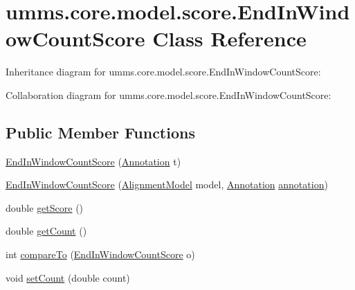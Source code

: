 \hypertarget{classumms_1_1core_1_1model_1_1score_1_1_end_in_window_count_score}{\section{umms.\+core.\+model.\+score.\+End\+In\+Window\+Count\+Score Class Reference}
\label{classumms_1_1core_1_1model_1_1score_1_1_end_in_window_count_score}
}


Inheritance diagram for umms.\+core.\+model.\+score.\+End\+In\+Window\+Count\+Score\+:


Collaboration diagram for umms.\+core.\+model.\+score.\+End\+In\+Window\+Count\+Score\+:
\subsection*{Public Member Functions}
\begin{DoxyCompactItemize}
\item 
\hyperlink{classumms_1_1core_1_1model_1_1score_1_1_end_in_window_count_score_a5cb45de125bb15970c63164c508bbd87}{End\+In\+Window\+Count\+Score} (\hyperlink{interfaceumms_1_1core_1_1annotation_1_1_annotation}{Annotation} t)
\item 
\hyperlink{classumms_1_1core_1_1model_1_1score_1_1_end_in_window_count_score_a567fee8b5894ad2366da66b2f2ebc38d}{End\+In\+Window\+Count\+Score} (\hyperlink{classumms_1_1core_1_1model_1_1_alignment_model}{Alignment\+Model} model, \hyperlink{interfaceumms_1_1core_1_1annotation_1_1_annotation}{Annotation} \hyperlink{classumms_1_1core_1_1model_1_1score_1_1_window_score_1_1_abstract_window_score_a455fb02f18f492e611113b9da0a24888}{annotation})
\item 
double \hyperlink{classumms_1_1core_1_1model_1_1score_1_1_end_in_window_count_score_a54e9f7ec3a667641fab13fa15b162f7c}{get\+Score} ()
\item 
double \hyperlink{classumms_1_1core_1_1model_1_1score_1_1_end_in_window_count_score_afe68efa9b172f5426ad85a65159b1099}{get\+Count} ()
\item 
int \hyperlink{classumms_1_1core_1_1model_1_1score_1_1_end_in_window_count_score_aa9e48a00f68443a78aa022d0b0af17f7}{compare\+To} (\hyperlink{classumms_1_1core_1_1model_1_1score_1_1_end_in_window_count_score}{End\+In\+Window\+Count\+Score} o)
\item 
void \hyperlink{classumms_1_1core_1_1model_1_1score_1_1_end_in_window_count_score_a2aa0769ad6490f25b6daffbe413f99d8}{set\+Count} (double count)
\end{DoxyCompactItemize}
